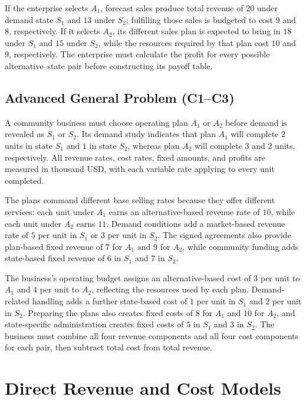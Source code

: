 	If the enterprise selects \(A_1\), forecast sales produce total revenue of \(20\) under demand state \(S_1\) and \(13\) under \(S_2\); fulfilling those sales is budgeted to cost \(9\) and \(8\), respectively. If it selects \(A_2\), its different sales plan is expected to bring in \(18\) under \(S_1\) and \(15\) under \(S_2\), while the resources required by that plan cost \(10\) and \(9\), respectively. The enterprise must calculate the profit for every possible alternative--state pair before constructing its payoff table.

	\subsection{Advanced General Problem (C1--C3)}
	\label{sec:problem2-advanced-general-c1-c3}

	A community business must choose operating plan \(A_1\) or \(A_2\) before demand is revealed as \(S_1\) or \(S_2\). Its demand study indicates that plan \(A_1\) will complete \(2\) units in state \(S_1\) and \(1\) in state \(S_2\), whereas plan \(A_2\) will complete \(3\) and \(2\) units, respectively. All revenue rates, cost rates, fixed amounts, and profits are measured in thousand USD, with each variable rate applying to every unit completed.

	The plans command different base selling rates because they offer different services: each unit under \(A_1\) earns an alternative-based revenue rate of \(10\), while each unit under \(A_2\) earns \(11\). Demand conditions add a market-based revenue rate of \(5\) per unit in \(S_1\) or \(3\) per unit in \(S_2\). The signed agreements also provide plan-based fixed revenue of \(7\) for \(A_1\) and \(9\) for \(A_2\), while community funding adds state-based fixed revenue of \(6\) in \(S_1\) and \(7\) in \(S_2\).

	The business's operating budget assigns an alternative-based cost of \(3\) per unit to \(A_1\) and \(4\) per unit to \(A_2\), reflecting the resources used by each plan. Demand-related handling adds a further state-based cost of \(1\) per unit in \(S_1\) and \(2\) per unit in \(S_2\). Preparing the plans also creates fixed costs of \(8\) for \(A_1\) and \(10\) for \(A_2\), and state-specific administration creates fixed costs of \(5\) in \(S_1\) and \(3\) in \(S_2\). The business must combine all four revenue components and all four cost components for each pair, then subtract total cost from total revenue.

	\section{Direct Revenue and Cost Models}
	\label{sec:direct-revenue-cost-models}

